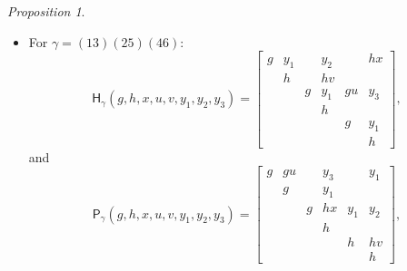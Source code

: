\documentclass[12pt]{amsart}
\theoremstyle{Theorem}
\theoremstyle{Theorem}
\theoremstyle{Theorem}
\theoremstyle{Theorem}
\theoremstyle{Plain}
\theoremstyle{remark}
\theoremstyle{remark}
\theoremstyle{Definition}
\newtheorem{prpd}[dfn]{Proposition}
\begin{document}
\begin{prpd}
\begin{itemize}
\[\begin{bmatrix}
                  &    &    & h  &   &   \\
                  &    &    &    & g & hx\\
                  &    &    &    &   & h
            \end{bmatrix}
        \]
        and
        \[
            \mathsf{P}_\gamma (g, h, x, u, v, y ) = 
            \begin{bmatrix}
                g & hx &   &    &    &   \\
                  & h  &   &    &    &   \\
                  &    & g & gu & hx & y \\                        
                  &    &   & g  &    & hx\\ 
                  &    &   &    & h  & hv\\
                  &    &   &    &    & h
            \end{bmatrix}
            ,
        \]
        where $ g, h \in k^\times $ and $ x, u, v, y \in k $.
        \item[\rm(c)] For $ \gamma = (13)(25)(46) $:
        \[
            \mathsf{H}_\gamma ( g, h, x, u, v, y_1, y_2, y_3 ) = 
            \begin{bmatrix}
                g & y_1 &   & y_2 &    & hx \\
                  & h   &   & hv  &    &    \\
                  &     & g & y_1 & gu & y_3\\
                  &     &   & h   &    &    \\
                  &     &   &     & g  & y_1\\
                  &     &   &     &    & h
            \end{bmatrix}
            ,
        \]
        and
        \[
            \mathsf{P}_\gamma ( g, h, x, u, v, y_1, y_2, y_3 ) =
            \begin{bmatrix}
                g & gu &   & y_3 &     & y_1\\
                  & g  &   & y_1 &     &    \\
                  &    & g & hx  & y_1 & y_2\\
                  &    &   & h   &     &    \\
                  &    &   &     & h   & hv \\
                  &    &   &     &     & h
            \end{bmatrix}
            ,
        \]

\end{itemize}
\end{prpd}
\end{document}
